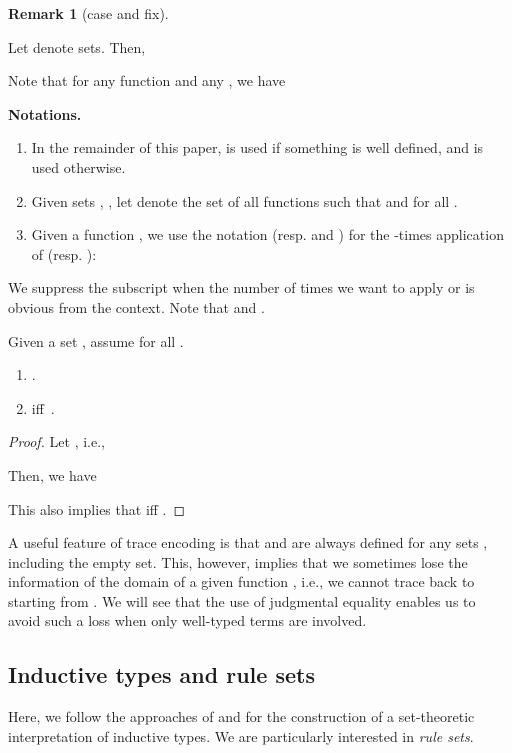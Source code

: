 \documentclass{LMCS}
\theoremstyle{plain}
\theoremstyle{definition}
\newtheorem{remm}[thm]{Remark}
\begin{document}
\begin{remm}[\textsf{case} and \textsf{fix}]
\begin{enumerate}[(1)]
\begin{defi}
Let  denote sets. Then,

\end{defi}

Note that for any function  and any , we have


\noindent\textbf{Notations.}
\begin{enumerate}[(1)]
\item In the remainder of this paper,  is used if something is well defined, and  is used otherwise.
\item Given sets , , let  denote the set of all functions  such that  and  for all .

\item Given a function , we use the notation  (resp. and ) for the -times application of  (resp. ):

\end{enumerate}

We suppress the subscript  when the number of times we want to apply  or  is obvious from the context. Note that  and .
\begin{lem}\label{A-poly}
Given a set , assume  for all .
\begin{enumerate}[\em(1)]
\item .
\item  iff\, .
\end{enumerate}
\end{lem}
\begin{proof}
Let , i.e.,
  
  Then, we have
  
  This also implies that  iff .
\end{proof}

\begin{rem}
A useful feature of trace encoding is that  and  are always defined for any sets , including the empty set. This, however, implies that we sometimes lose the information of the domain of a given function , i.e., we cannot trace back to  starting from . We will see that the use of judgmental equality enables us to avoid such a loss when only well-typed terms are involved.
\end{rem}

\subsection{Inductive types and rule sets}

Here, we follow the approaches of \cite{aczel-relating} and \cite{dybjer} for the construction of a set-theoretic interpretation of inductive types. We are particularly interested in \emph{rule sets}.


\end{enumerate}
\end{remm}
\end{document}
